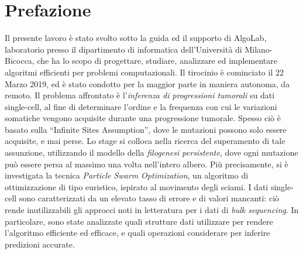 \newpage
\cleardoublepage
\begingroup
\let\clearpage\endgroup
\null{}
\chapter*{\centering Prefazione}

Il presente lavoro è stato svolto sotto la guida ed il supporto di AlgoLab, laboratorio presso il dipartimento di informatica dell'Università di Milano-Bicocca, che ha lo scopo di progettare, studiare, analizzare ed implementare algoritmi efficienti per problemi computazionali. Il tirocinio è cominciato il 22 Marzo 2019, ed è stato condotto per la maggior parte in maniera autonoma, da remoto.
Il problema affrontato è l'\textit{inferenza di progressioni tumorali} su dati single-cell, al fine di determinare l'ordine e la frequenza con cui le variazioni somatiche vengono acquisite durante una progressione tumorale. Spesso ciò è basato sulla “Infinite Sites Assumption”, dove le mutazioni possono solo essere acquisite, e mai perse. Lo stage si colloca nella ricerca del superamento di tale assunzione, utilizzando il modello della \textit{filogenesi persistente}, dove ogni mutazione può essere persa al massimo una volta nell'intero albero. Più precisamente, si è investigata la tecnica \textit{Particle Swarm Optimization}, un algoritmo di ottimizzazione di tipo euristico, ispirato al movimento degli sciami. I dati single-cell sono caratterizzati da un elevato tasso di errore e di valori mancanti: ciò rende inutilizzabili gli approcci noti in letteratura per i dati di \textit{bulk sequencing}. In particolare, sono state analizzate quali strutture dati utilizzare per rendere l'algoritmo efficiente ed efficace, e quali operazioni considerare per inferire predizioni accurate.

 \null
